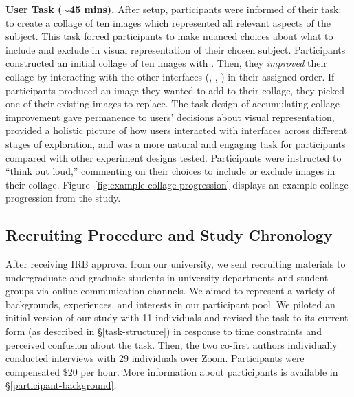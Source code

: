 \textbf{User Task ($\sim$45 mins).}
After setup, participants were informed of their task: to create a collage of ten images which represented all relevant aspects of the subject.
This task forced participants to make nuanced choices about what to include and exclude in visual representation of their chosen subject.
Participants constructed an initial collage of ten images with \baseline.
Then, they \textit{improved} their collage by interacting with the other interfaces (\diverse, , \agonistic) in their assigned order. 
If participants produced an image they wanted to add to their collage, they picked one of their existing images to replace.
The task design of accumulating collage improvement gave permanence to users' decisions about visual representation, provided a holistic picture of how users interacted with interfaces across different stages of exploration, and was a more natural and engaging task for participants compared with other experiment designs tested.
Participants were instructed to ``think out loud,'' commenting on their choices to include or exclude images in their collage.
Figure~\ref{fig:example-collage-progression} displays an example collage progression from the study.



\subsection{Recruiting Procedure and Study Chronology}
\label{recruiting-procedure}

After receiving IRB approval from our university, we sent recruiting materials to undergraduate and graduate students in university departments and student groups via online communication channels.
We aimed to represent a variety of backgrounds, experiences, and interests in our participant pool.
We piloted an initial version of our study with 11 individuals and revised the task to its current form (as described in \S\ref{task-structure}) in response to time constraints and perceived confusion about the task.
Then, the two co-first authors individually conducted interviews with 29 individuals over Zoom.
Participants were compensated $\$20$ per hour.
More information about participants is available in \S\ref{participant-background}.




